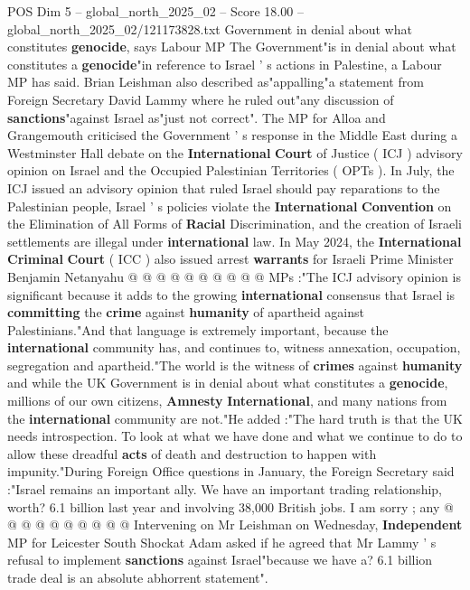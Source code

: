 \begin{textsample}{POS Dim 5 – global\_north\_2025\_02 – Score 18.00 – global\_north\_2025\_02/121173828.txt}  \label{ex:f5_pos_204}
Government in denial about what constitutes \textbf{genocide}, says Labour MP The Government"is in denial about what constitutes a \textbf{genocide}"in reference to Israel ' s actions in Palestine, a Labour MP has said.
Brian Leishman also described as"appalling"a statement from Foreign Secretary David Lammy where he ruled out"any discussion of \textbf{sanctions}"against Israel as"just not correct".
The MP for Alloa and Grangemouth criticised the Government ' s response in the Middle East during a Westminster Hall debate on the \textbf{International} \textbf{Court} of Justice ( ICJ ) advisory opinion on Israel and the Occupied Palestinian Territories ( OPTs ).
In July, the ICJ issued an advisory opinion that ruled Israel should pay reparations to the Palestinian people, Israel ' s policies violate the \textbf{International} \textbf{Convention} on the Elimination of All Forms of \textbf{Racial} Discrimination, and the creation of Israeli settlements are illegal under \textbf{international} law.
In May 2024, the \textbf{International} \textbf{Criminal} \textbf{Court} ( ICC ) also issued arrest \textbf{warrants} for Israeli Prime Minister Benjamin Netanyahu @ @ @ @ @ @ @ @ @ @ MPs :"The ICJ advisory opinion is significant because it adds to the growing \textbf{international} consensus that Israel is \textbf{committing} the \textbf{crime} against \textbf{humanity} of apartheid against Palestinians."And that language is extremely important, because the \textbf{international} community has, and continues to, witness annexation, occupation, segregation and apartheid."The world is the witness of \textbf{crimes} against \textbf{humanity} and while the UK Government is in denial about what constitutes a \textbf{genocide}, millions of our own citizens, \textbf{Amnesty} \textbf{International}, and many nations from the \textbf{international} community are not."He added :"The hard truth is that the UK needs introspection.
To look at what we have done and what we continue to do to allow these dreadful \textbf{acts} of death and destruction to happen with impunity."During Foreign Office questions in January, the Foreign Secretary said :"Israel remains an important ally.
We have an important trading relationship, worth? 6.1 billion last year and involving 38,000 British jobs.
I am sorry ; any @ @ @ @ @ @ @ @ @ @ Intervening on Mr Leishman on Wednesday, \textbf{Independent} MP for Leicester South Shockat Adam asked if he agreed that Mr Lammy ' s refusal to implement \textbf{sanctions} against Israel"because we have a? 6.1 billion trade deal is an absolute abhorrent statement".

\end{textsample}
